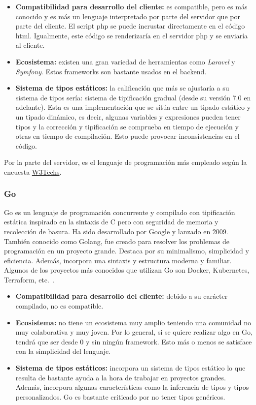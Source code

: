 \begin{itemize}
    \item[\mal] \textbf{Compatibilidad para desarrollo del cliente:} es compatible, pero es más conocido y es más un lenguaje interpretado por parte del servidor que por parte del cliente. El script php se puede incrustar directamente en el código html. Igualmente, este código se renderizaría en el servidor php y se enviaría al cliente.
    \item[\bien] \textbf{Ecosistema:} existen una gran variedad de herramientas como \textit{Laravel} y \textit{Symfony}. Estos frameworks son bastante usados en el backend.
    \item[\bien] \textbf{Sistema de tipos estáticos:} la calificación que más se ajustaría a su sistema de tipos sería: sistema de tipificación gradual (desde su versión 7.0 en adelante). Esta es una implementación que se sitúa entre un tipado estático y un tipado dinámico, es decir, algunas variables y expresiones pueden tener tipos y la corrección y tipificación se comprueba en tiempo de ejecución y otras en tiempo de compilación. Esto puede provocar inconsistencias en el código.
\end{itemize}

Por la parte del servidor, es el lenguaje de programación más empleado según la encuesta \href{https://w3techs.com/technologies/overview/programming_language}{W3Techs}.

\subsubsection{Go}

Go es un lenguaje de programación concurrente y compilado con tipificación estática inspirado en la sintaxis de C pero con seguridad de memoria y recolección de basura. Ha sido desarrollado por Google y lanzado en 2009. También conocido como Golang, fue creado para resolver los problemas de programación en un proyecto grande. Destaca por su minimalismo, simplicidad y eficiencia. Además, incorpora una sintaxis y estructura moderna y familiar. Algunos de los proyectos más conocidos que utilizan Go son Docker, Kubernetes, Terraform, etc.~\cite{go-wiki}.

\begin{itemize}
    \item[\mal] \textbf{Compatibilidad para desarrollo del cliente:} debido a su carácter compilado, no es compatible.
    \item[\regular] \textbf{Ecosistema:} no tiene un ecosistema muy amplio teniendo una comunidad no muy colaborativa y muy joven. Por lo general, si se quiere realizar algo en Go, tendrá que ser desde 0 y sin ningún framework. Esto más o menos se satisface con la simplicidad del lenguaje.
    \item[\bien] \textbf{Sistema de tipos estáticos:} incorpora un sistema de tipos estático lo que resulta de bastante ayuda a la hora de trabajar en proyectos grandes. Además, incorpora algunas características como la inferencia de tipos y tipos personalizados. Go es bastante criticado por no tener tipos genéricos.
\end{itemize}

